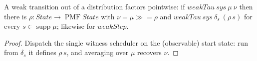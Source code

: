 \begin{lemma}
  \label{lem:decomp}
  \leanok
  A weak transition out of a distribution factors pointwise: if
  $weakTau\ sys\ \mu\ \nu$ then there is
  $\rho : State \to \operatorname{PMF} State$ with
  $\nu = \mu \mathbin{\gg\!=} \rho$ and $weakTau\ sys\ \delta_s\ (\rho\,s)$ for every
  $s \in \operatorname{supp}\mu$; likewise for $weakStep$.
\end{lemma}

\begin{proof}\leanok
  Dispatch the single witness scheduler on the (observable) start state: run from
  $\delta_s$ it defines $\rho\,s$, and averaging over $\mu$ recovers $\nu$.
\end{proof}
